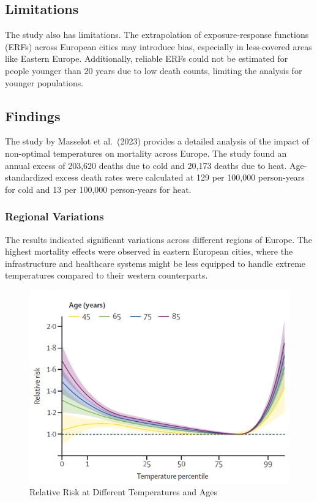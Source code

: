 \documentclass[
]{krantz}
\begin{document}
\subsection{Limitations}\label{limitations}

The study also has limitations. The extrapolation of exposure-response functions (ERFs) across European cities may introduce bias, especially in less-covered areas like Eastern Europe. Additionally, reliable ERFs could not be estimated for people younger than 20 years due to low death counts, limiting the analysis for younger populations.

\subsection{Findings}\label{findings}

The study by Masselot et al.~(2023) provides a detailed analysis of the impact of non-optimal temperatures on mortality across Europe. The study found an annual excess of 203,620 deaths due to cold and 20,173 deaths due to heat. Age-standardized excess death rates were calculated at 129 per 100,000 person-years for cold and 13 per 100,000 person-years for heat.

\subsubsection{Regional Variations}\label{regional-variations}

The results indicated significant variations across different regions of Europe. The highest mortality effects were observed in eastern European cities, where the infrastructure and healthcare systems might be less equipped to handle extreme temperatures compared to their western counterparts.

\begin{figure}
\centering
\includegraphics{work/09-epidemiologic/figures/Bild1.png}
\caption{Relative Risk at Different Temperatures and Ages}
\end{figure}
\end{document}
